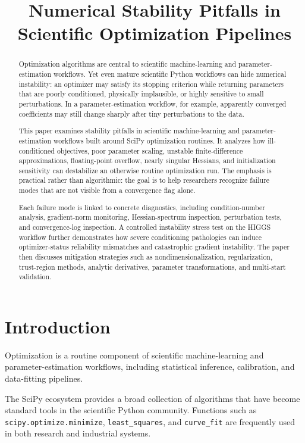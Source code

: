 \title{Numerical Stability Pitfalls in Scientific Optimization Pipelines}

\begin{abstract}

Optimization algorithms are central to scientific machine-learning and parameter-estimation workflows. Yet even mature scientific Python workflows can hide numerical instability: an optimizer may satisfy its stopping criterion while returning parameters that are poorly conditioned, physically implausible, or highly sensitive to small perturbations. In a parameter-estimation workflow, for example, apparently converged coefficients may still change sharply after tiny perturbations to the data.

This paper examines stability pitfalls in scientific machine-learning and parameter-estimation workflows built around SciPy optimization routines. It analyzes how ill-conditioned objectives, poor parameter scaling, unstable finite-difference approximations, floating-point overflow, nearly singular Hessians, and initialization sensitivity can destabilize an otherwise routine optimization run. The emphasis is practical rather than algorithmic: the goal is to help researchers recognize failure modes that are not visible from a convergence flag alone.

Each failure mode is linked to concrete diagnostics, including condition-number analysis, gradient-norm monitoring, Hessian-spectrum inspection, perturbation tests, and convergence-log inspection. A controlled instability stress test on the HIGGS workflow further demonstrates how severe conditioning pathologies can induce optimizer-status reliability mismatches and catastrophic gradient instability. The paper then discusses mitigation strategies such as nondimensionalization, regularization, trust-region methods, analytic derivatives, parameter transformations, and multi-start validation.

\end{abstract}

\section{Introduction}

Optimization is a routine component of scientific machine-learning and parameter-estimation workflows, including statistical inference, calibration, and data-fitting pipelines.

The SciPy ecosystem provides a broad collection of algorithms that have become standard tools in the scientific Python community. Functions such as \texttt{scipy.optimize.minimize}, \texttt{least\_squares}, and \texttt{curve\_fit} are frequently used in both research and industrial systems.

